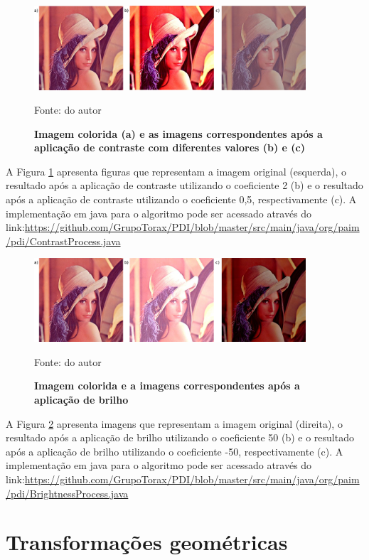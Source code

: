 \documentclass[
	12pt,				%
	oneside,			%
	a4paper,			%
	english,			%
	french,				%
	spanish,			%
	brazil,				%
	]{abntex2}
\begin{document}
\begin{figure}[ht]
\centering
\caption{\textbf{Imagem colorida (a) e as imagens correspondentes após a aplicação de contraste com diferentes valores (b) e (c)}}
\includegraphics[width=0.9\textwidth]{imagens/contraste.png}

Fonte: do autor
\label{fig:contraste}
\end{figure}

A Figura \ref{fig:contraste} apresenta figuras que representam a imagem original (esquerda), o resultado após a aplicação de contraste utilizando o coeficiente 2 (b) e o resultado após a aplicação de contraste utilizando o coeficiente 0,5, respectivamente (c). A implementação em java para o algoritmo pode ser acessado através do link:\url{https://github.com/GrupoTorax/PDI/blob/master/src/main/java/org/paim/pdi/ContrastProcess.java}

\begin{figure}[ht]
\centering
\caption{\textbf{Imagem colorida e a imagens correspondentes após a aplicação de brilho}}
\includegraphics[width=0.9\textwidth]{imagens/brilho.png}

Fonte: do autor
\label{fig:brilho}
\end{figure}

A Figura \ref{fig:brilho} apresenta imagens que representam a imagem original (direita), o resultado após a aplicação de brilho utilizando o coeficiente 50 (b) e o resultado após a aplicação de brilho utilizando o coeficiente -50, respectivamente (c). A implementação em java para o algoritmo pode ser acessado através do link:\url{https://github.com/GrupoTorax/PDI/blob/master/src/main/java/org/paim/pdi/BrightnessProcess.java}

\section{Transformações geométricas}
\end{document}
